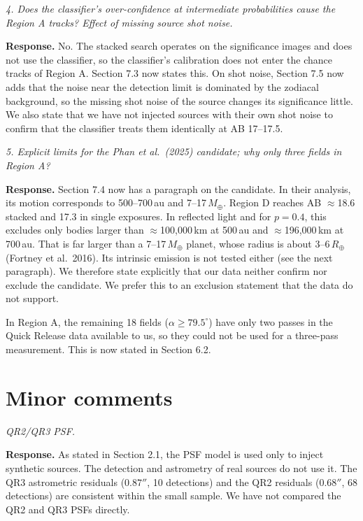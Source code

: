 \documentclass[11pt]{article}
\newenvironment{referee}{\par\color{black!60}\itshape}{\par}
\newcommand{\resp}{\par\noindent\textbf{Response.} }
\begin{document}
\begin{referee}
4. Does the classifier's over-confidence at intermediate probabilities cause the Region A tracks? Effect of missing source shot noise.
\end{referee}
\resp No. The stacked search operates on the significance images and does not use the classifier, so the classifier's calibration does not enter the chance tracks of Region A. Section 7.3 now states this. On shot noise, Section 7.5 now adds that the noise near the detection limit is dominated by the zodiacal background, so the missing shot noise of the source changes its significance little. We also state that we have not injected sources with their own shot noise to confirm that the classifier treats them identically at AB 17--17.5.

\begin{referee}
5. Explicit limits for the Phan et al.\ (2025) candidate; why only three fields in Region A?
\end{referee}
\resp Section 7.4 now has a paragraph on the candidate. In their analysis, its motion corresponds to 500--700\,au and 7--17\,$M_\oplus$. Region D reaches AB $\approx$18.6 stacked and 17.3 in single exposures. In reflected light and for $p = 0.4$, this excludes only bodies larger than $\approx$100{,}000\,km at 500\,au and $\approx$196{,}000\,km at 700\,au. That is far larger than a 7--17\,$M_\oplus$ planet, whose radius is about 3--6\,$R_\oplus$ (Fortney et al.\ 2016). Its intrinsic emission is not tested either (see the next paragraph). We therefore state explicitly that our data neither confirm nor exclude the candidate. We prefer this to an exclusion statement that the data do not support.

In Region A, the remaining 18 fields ($\alpha \ge 79.5^\circ$) have only two passes in the Quick Release data available to us, so they could not be used for a three-pass measurement. This is now stated in Section 6.2.

\section*{Minor comments}

\begin{referee}
QR2/QR3 PSF.
\end{referee}
\resp As stated in Section 2.1, the PSF model is used only to inject synthetic sources. The detection and astrometry of real sources do not use it. The QR3 astrometric residuals ($0.87''$, 10 detections) and the QR2 residuals ($0.68''$, 68 detections) are consistent within the small sample. We have not compared the QR2 and QR3 PSFs directly.
\end{document}
